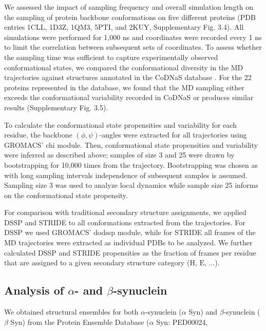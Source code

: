 We assessed the impact of sampling frequency and overall simulation length on the sampling of protein backbone conformations on five different proteins (PDB entries 1CLL, 1D3Z, 1QM3, 5PTI, and 2KUY, Supplementary Fig. 3.4).
All simulations were performed for 1,000 ns and coordinates were recorded every 1 ns to limit the correlation between subsequent sets of coordinates. To assess whether the sampling time was sufficient to capture experimentally observed conformational states, we compared the conformational diversity in the MD trajectories against structures annotated in the CoDNaS database \cite{monzon_codnas_2016}. For the 22 proteins represented in the database, we found that the MD sampling either exceeds the conformational variability recorded in CoDNaS or produces similar results (Supplementary Fig. 3.5).

To calculate the conformational state propensities and variability for each residue, the backbone $(\phi, \psi)$-angles were extracted for all trajectories using GROMACS' chi module. Then, conformational state propensities and variability were inferred as described above; samples of size 3 and 25 were drawn by bootstrapping for 10,000 times from the trajectory. Bootstrapping was chosen as with long sampling intervals independence of subsequent samples is assumed. Sampling size 3 was used to analyze local dynamics while sample size 25 informs on the conformational state propensity. 

For comparison with traditional secondary structure assignments, we applied DSSP \cite{touw_series_2015,kabsch_dictionary_1983} and STRIDE \cite{lovell_structure_2003,frishman_knowledge-based_1995} to all conformations extracted from the trajectories. For DSSP we used GROMACS' do\textunderscore dssp module, while for STRIDE all frames of the MD trajectories were extracted as individual PDBs to be analyzed. We further calculated DSSP and STRIDE propensities as the fraction of frames per residue that are assigned to a given secondary structure category ($\text{H}$, $\text{E}$, ...).


\subsection[Analysis of alpha- and beta-synuclein]{Analysis of $\alpha$- and $\beta$-synuclein}\label{methods:synuclein_analysis}

\parfillskip=0pt
We obtained structural ensembles for both $\alpha$-synuclein ($\alpha$ Syn) and $\beta$-synuclein ($\beta$ Syn) from the Protein Ensemble Database ($\alpha$ Syn: PED00024, 

